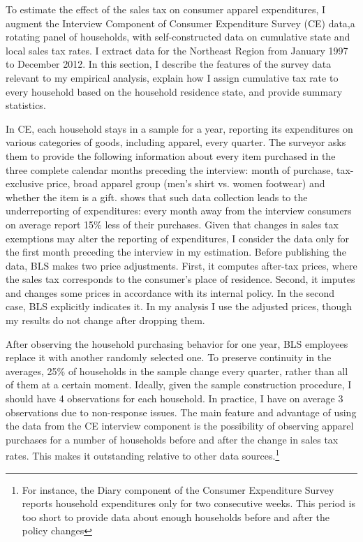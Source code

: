 \documentclass[12pt]{article}
\begin{document}
	To estimate the effect of the sales tax on consumer apparel expenditures, I augment the Interview Component of Consumer Expenditure Survey (CE) data,a rotating panel of households, with self-constructed data on cumulative state and local sales tax rates. I extract data for the Northeast Region from January 1997 to December 2012. In this section, I describe the features of the survey data relevant to my empirical analysis, explain how I assign cumulative tax rate to every household based on the household residence state, and provide summary statistics. 
	
	In CE, each household stays in a sample for a year, reporting its expenditures on various categories of goods, including apparel, every quarter. The surveyor asks them to provide the following information about every item purchased in the three complete calendar months preceding the interview: month of purchase, tax-exclusive price, broad apparel group (men's shirt vs. women footwear) and whether the item is a gift. \citet{bradburn} shows that such data collection leads to the underreporting of expenditures: every month away from the interview consumers on average report 15\% less of their purchases. Given that changes in sales tax exemptions may alter the reporting of expenditures, I consider the data only for the first month preceding the interview in my estimation. Before publishing the data, BLS makes two price adjustments. First, it computes after-tax prices, where the sales tax corresponds to the consumer's place of residence. Second, it imputes and changes some prices in accordance with its internal policy. In the second case, BLS explicitly indicates it. In my analysis I use the adjusted prices, though my results do not change after dropping them. 
	
	After observing the household purchasing behavior for one year, BLS employees replace it with another randomly selected one. To preserve continuity in the averages, 25\% of households in the sample change every quarter, rather than all of them at a certain moment. Ideally, given the sample construction procedure, I should have 4 observations for each household. In practice, I have on average 3 observations due to non-response issues. The main feature and advantage of using the data from the CE interview component is the possibility of observing apparel purchases for a number of households before and after the change in sales tax rates. This makes it outstanding relative to other data sources.\footnote{For instance, the Diary component of the Consumer Expenditure Survey reports household expenditures only for two consecutive weeks. This period is too short to provide data about enough households before and after the policy changes}
	
\end{document}
